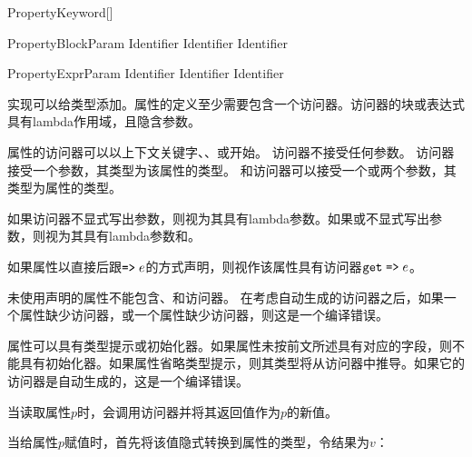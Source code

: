 \begin{bnf}{PropertyKeyword}[\oneof]
\end{bnf}

\begin{bnf}{PropertyBlockParam}
    Identifier \br
    Identifier \terminal{,} Identifier
\end{bnf}

\begin{bnf}{PropertyExprParam}
    Identifier \br
    \terminal{(} Identifier \terminal{,} Identifier \terminal{)}
\end{bnf}

\pnum
实现可以给类型添加。属性的定义至少需要包含一个访问器。访问器的块或表达式具有lambda作用域，且隐含参数。

\pnum
属性的访问器可以以上下文关键字、、或开始。
访问器不接受任何参数。
访问器接受一个参数，其类型为该属性的类型。
和访问器可以接受一个或两个参数，其类型为属性的类型。

\pnum
如果访问器不显式写出参数，则视为其具有lambda参数。如果或不显式写出参数，则视为其具有lambda参数和。

\pnum
如果属性以直接后跟$\mathrel{\texttt{=>}}e$的方式声明，则视作该属性具有访问器$\texttt{get} \mathrel{\texttt{=>}} e$。

\pnum
未使用声明的属性不能包含、和访问器。
在考虑自动生成的访问器之后，如果一个属性缺少访问器，或一个属性缺少访问器，则这是一个编译错误。

\pnum
属性可以具有类型提示或初始化器。如果属性未按前文所述具有对应的字段，则不能具有初始化器。如果属性省略类型提示，则其类型将从访问器中推导。如果它的访问器是自动生成的，这是一个编译错误。

\pnum
当读取属性$p$时，会调用访问器并将其返回值作为$p$的新值。

\pnum
当给属性$p$赋值时，首先将该值隐式转换到属性的类型，令结果为$v$：

